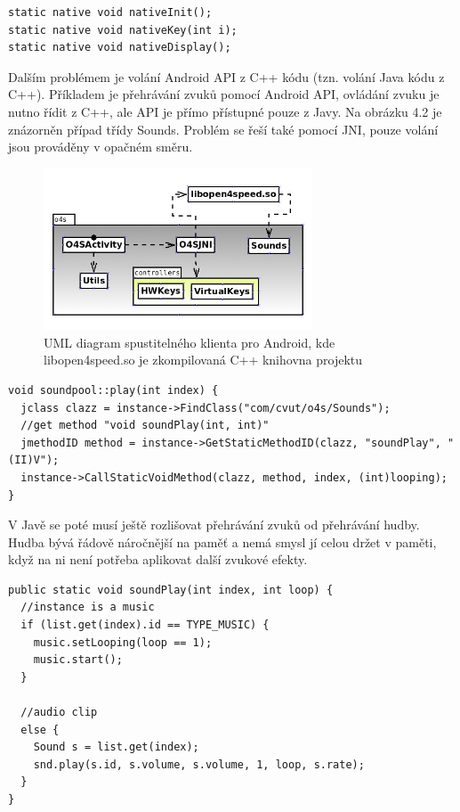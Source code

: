 \documentclass[11pt,twoside,a4paper]{book}
\begin{document}
\lstset{language=Java} 
\begin{lstlisting}[caption=Ukázka deklarování C++ metod v Java kódu]
static native void nativeInit();
static native void nativeKey(int i);
static native void nativeDisplay();
\end{lstlisting}
\newpage

Dalším problémem je volání Android API z C++ kódu (tzn. volání Java kódu z C++). Příkladem je přehrávání zvuků pomocí Android API, ovládání zvuku je nutno řídit z C++, ale API je přímo přístupné pouze z Javy. Na obrázku 4.2 je znázorněn případ třídy Sounds. Problém se řeší také pomocí JNI, pouze volání jsou prováděny v opačném směru.

\begin{center}
\begin{figure}[h]
\includegraphics[width=80mm]{figures/jni.png}
\caption{UML diagram spustitelného klienta pro Android, kde libopen4speed.so je zkompilovaná C++ knihovna projektu}
\end{figure}
\end{center}

\lstset{language=C++} 
\begin{lstlisting}[caption=Volání Java metody pro přehrání zvuku z C++ kódu]
void soundpool::play(int index) {
  jclass clazz = instance->FindClass("com/cvut/o4s/Sounds");
  //get method "void soundPlay(int, int)"
  jmethodID method = instance->GetStaticMethodID(clazz, "soundPlay", "(II)V");
  instance->CallStaticVoidMethod(clazz, method, index, (int)looping);
}
\end{lstlisting}

V Javě se poté musí ještě rozlišovat přehrávání zvuků od přehrávání hudby. Hudba bývá řádově náročnější na paměť a nemá smysl jí celou držet v paměti, když na ni není potřeba aplikovat další zvukové efekty.

\lstset{language=Java} 
\begin{lstlisting}[caption=Přehrání zvuku v Javě pomocí Android API]  
public static void soundPlay(int index, int loop) {
  //instance is a music
  if (list.get(index).id == TYPE_MUSIC) {
    music.setLooping(loop == 1);
    music.start();
  }

  //audio clip
  else {
    Sound s = list.get(index);
    snd.play(s.id, s.volume, s.volume, 1, loop, s.rate);
  }
}
\end{lstlisting}
\end{document}
